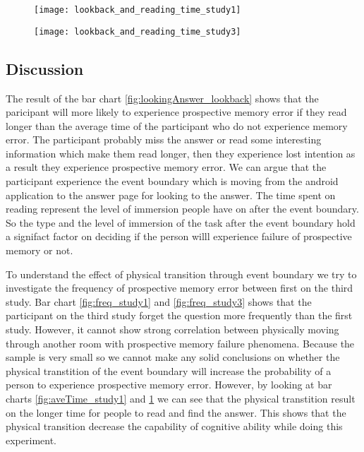 \begin{figure}[!h]
\centering
\begin{minipage}{.5\textwidth}
  \centering
  \texttt{[image: lookback\_and\_reading\_time\_study1]}
  \captionsetup{justification=centering}
  \label{fig:aveTime_study1}
\end{minipage}%
\begin{minipage}{.5\textwidth}
  \centering
  \texttt{[image: lookback\_and\_reading\_time\_study3]}
  \captionsetup{justification=centering}
  \label{fig:aveTime_study3}
\end{minipage}
\end{figure}

\subsection{Discussion}
The result of the bar chart \ref{fig:lookingAnswer_lookback}  shows that the paricipant will more likely to experience prospective memory error if they read longer than the average time
of the participant who do not experience memory error. The participant probably miss the answer or read some interesting information which
make them read longer, then they experience lost intention \cite{Reason1984} as a result they experience  prospective memory error.
We can argue that the participant experience the event boundary which is moving from the android application to the answer page for looking to the answer.
The time spent on reading represent the level of immersion people have on after the event boundary. So the type and the level of immersion of the task after the event
boundary hold a signifact factor on deciding if the person willl experience failure of prospective memory or not.

To understand the effect of physical transition through event boundary we try to investigate the frequency of prospective memory error between first on the third study.
Bar chart \ref{fig:freq_study1} and \ref{fig:freq_study3} shows that the participant on the third study forget the question more frequently than the first study. However,
it cannot show strong correlation between physically moving through another room with prospective memory failure phenomena.
Because the sample is very small so we cannot make any solid conclusions on whether the physical transtition of the event boundary will increase the probability of a person to experience
prospective memory error. However, by looking at bar charts \ref{fig:aveTime_study1} and \ref{fig:aveTime_study3} we can see that the physical transtition result on the longer time for people to read and find the answer.
This shows that the physical transition decrease the capability of cognitive ability while doing this experiment.
